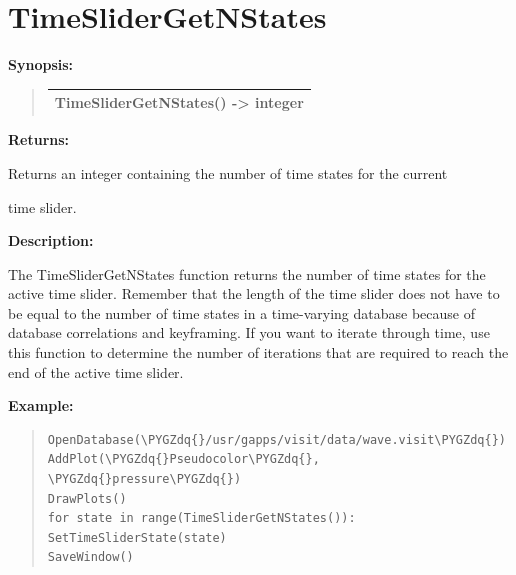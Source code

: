 \documentclass[letterpaper,10pt,english]{sphinxmanual}
\def\PYGZdq{\char`\"}
\begin{document}
\section{TimeSliderGetNStates}
\label{functions:timeslidergetnstates}
\begin{DUlineblock}{0em}
\item[] \textbf{Synopsis:}
\end{DUlineblock}
\begin{quote}

\begin{tabulary}{\linewidth}{|L|}
\hline

TimeSliderGetNStates() -\textgreater{} integer
\\
\hline\end{tabulary}

\end{quote}

\begin{DUlineblock}{0em}
\item[] 
\item[] \textbf{Returns:}
\item[] Returns an integer containing the number of time states for the current
\item[] time slider.
\item[] 
\item[] \textbf{Description:}
\item[] The TimeSliderGetNStates function returns the number of time states for
the active time slider. Remember that the length of the time slider does
not have to be equal to the number of time states in a time-varying
database because of database correlations and keyframing. If you want to
iterate through time, use this function to determine the number of
iterations that are required to reach the end of the active time slider.
\end{DUlineblock}

\begin{DUlineblock}{0em}
\item[] 
\end{DUlineblock}

\begin{DUlineblock}{0em}
\item[] \textbf{Example:}
\item[] 
\end{DUlineblock}
\begin{quote}

\begin{Verbatim}[commandchars=\\\{\}]
OpenDatabase(\PYGZdq{}/usr/gapps/visit/data/wave.visit\PYGZdq{})
AddPlot(\PYGZdq{}Pseudocolor\PYGZdq{}, \PYGZdq{}pressure\PYGZdq{})
DrawPlots()
for state in range(TimeSliderGetNStates()):
SetTimeSliderState(state)
SaveWindow()
\end{Verbatim}
\end{quote}
\end{document}

